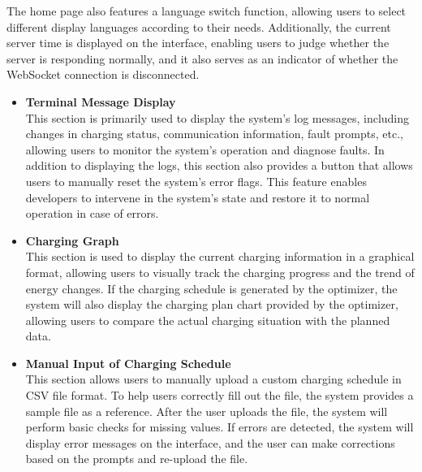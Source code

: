 \documentclass[
english,
ruledheaders=section,%
class=report,%
thesis={type=Report},%
accentcolor=9c,%
custommargins=true,%
marginpar=false,%
parskip=half-,%
fontsize=11pt,%
logofile={img/tuda_logo.pdf}, %
]{tudapub}
\begin{document}
        The home page also features a language switch function, allowing users to select different display languages according to their needs. Additionally, the current server time is displayed on the interface, enabling users to judge whether the server is responding normally, and it also serves as an indicator of whether the WebSocket connection is disconnected.
        \begin{itemize}
            \item \textbf{Terminal Message Display}\\
            This section is primarily used to display the system's log messages, including changes in charging status, communication information, fault prompts, etc., allowing users to monitor the system's operation and diagnose faults. In addition to displaying the logs, this section also provides a button that allows users to manually reset the system's error flags. This feature enables developers to intervene in the system's state and restore it to normal operation in case of errors.
            \item \textbf{Charging Graph}\\
            This section is used to display the current charging information in a graphical format, allowing users to visually track the charging progress and the trend of energy changes. If the charging schedule is generated by the optimizer, the system will also display the charging plan chart provided by the optimizer, allowing users to compare the actual charging situation with the planned data.
            \item \textbf{Manual Input of Charging Schedule}\\
            This section allows users to manually upload a custom charging schedule in CSV file format. To help users correctly fill out the file, the system provides a sample file as a reference. After the user uploads the file, the system will perform basic checks for missing values. If errors are detected, the system will display error messages on the interface, and the user can make corrections based on the prompts and re-upload the file.
        \end{itemize}



\end{document}
